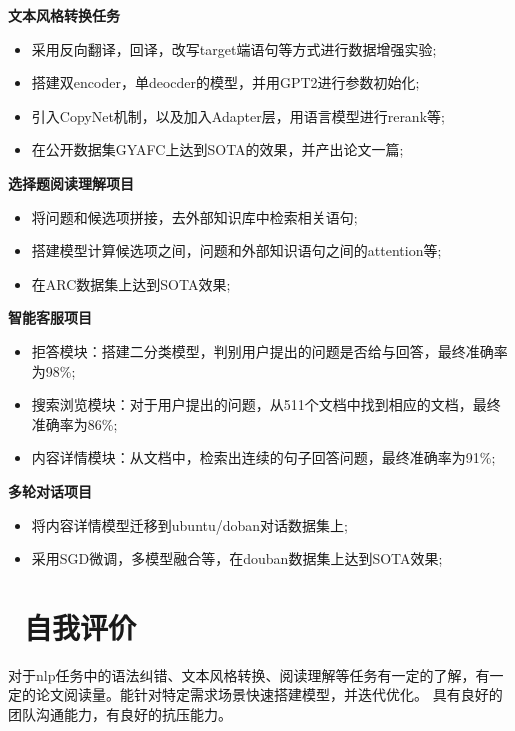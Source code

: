\documentclass{resume}
\begin{document}
\textbf{文本风格转换任务}
\begin{itemize}
  \item 采用反向翻译，回译，改写target端语句等方式进行数据增强实验;
  \item 搭建双encoder，单deocder的模型，并用GPT2进行参数初始化;
  \item 引入CopyNet机制，以及加入Adapter层，用语言模型进行rerank等;
  \item 在公开数据集GYAFC上达到SOTA的效果，并产出论文一篇;
\end{itemize}

\vspace{0.1cm}

\textbf{选择题阅读理解项目}
\begin{itemize}
  \item 将问题和候选项拼接，去外部知识库中检索相关语句;
  \item 搭建模型计算候选项之间，问题和外部知识语句之间的attention等;
  \item 在ARC数据集上达到SOTA效果;
\end{itemize}
\vspace{0.1cm}

\textbf{智能客服项目}
\begin{itemize}
  \item 拒答模块：搭建二分类模型，判别用户提出的问题是否给与回答，最终准确率为98\%;
  \item 搜索浏览模块：对于用户提出的问题，从511个文档中找到相应的文档，最终准确率为86\%;
  \item 内容详情模块：从文档中，检索出连续的句子回答问题，最终准确率为91\%;
\end{itemize}
\vspace{0.1cm}

\textbf{多轮对话项目}
\begin{itemize}
  \item 将内容详情模型迁移到ubuntu/doban对话数据集上;
  \item 采用SGD微调，多模型融合等，在douban数据集上达到SOTA效果;
\end{itemize}




\section{\faCogs\ 自我评价}
对于nlp任务中的语法纠错、文本风格转换、阅读理解等任务有一定的了解，有一定的论文阅读量。能针对特定需求场景快速搭建模型，并迭代优化。
具有良好的团队沟通能力，有良好的抗压能力。
%
%
\end{document}
